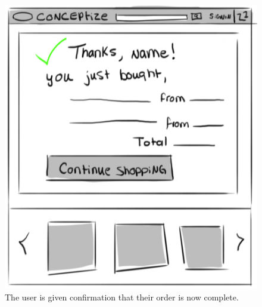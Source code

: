 \documentclass[]{article}
\begin{document}
\begin{enumerate}
		\begin{figure}
		  \includegraphics[width=\linewidth]{./pictures/confirmation.png}
		  \caption{The user is given confirmation that their order is now complete.}
		  \label{fig:buyer6}
		\end{figure}		
		

\end{enumerate}
\end{document}
